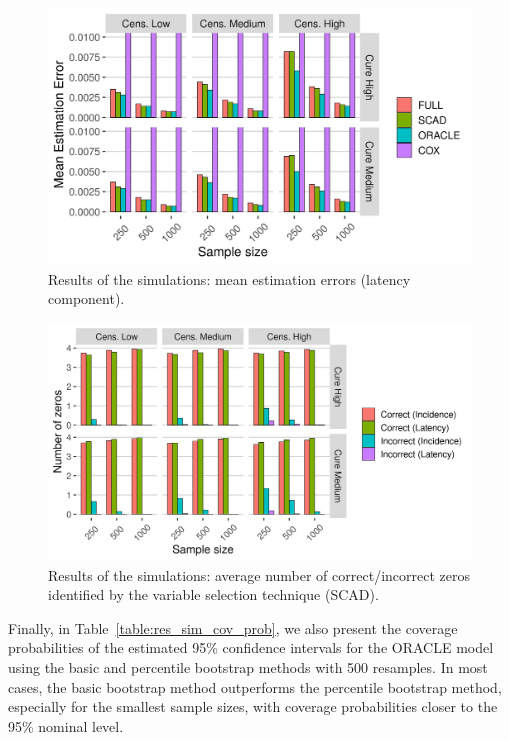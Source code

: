 \begin{figure}[hb!]
  \centering
  \includegraphics[scale=0.83]{fig_errors_SURV.png}
  \caption{Results of the simulations: mean estimation errors (latency component).}
  \label{figure:errors_SURV}
\end{figure}

\begin{figure}[hb!]
  \centering
  \includegraphics[scale=0.83]{fig_zeros_SCAD.png}
  \caption{Results of the simulations: average number of correct/incorrect zeros identified by the variable selection technique (SCAD).}
  \label{figure:zeros_SCAD}
\end{figure}


Finally, in Table~\ref{table:res_sim_cov_prob}, we also present the coverage probabilities of the estimated 95\% confidence intervals for the ORACLE model using the basic and percentile bootstrap methods with 500 resamples. In most cases, the basic bootstrap method outperforms the percentile bootstrap method, especially for the smallest sample sizes, with coverage probabilities closer to the 95\% nominal level. 


